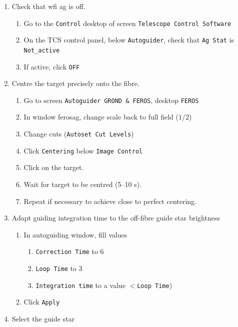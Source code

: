 \documentclass[11pt,fleqn,a4paper]{book}
\begin{document}
\label{proc:guideferosoff}
\begin{enumerate}
    \item Check that \gls{wfi} \gls{ag} is off.
    \begin{enumerate}
        \item Go to the \texttt{Control} \gls{desktop} of screen \texttt{Telescope Control Software}
        \item On the \gls{TCS control panel}, below \texttt{Autoguider}, check that \texttt{Ag Stat} is \texttt{Not\_active}
        \item If active, click \texttt{OFF} 
    \end{enumerate}
    \item Centre the target precisely onto the fibre.
    \begin{enumerate}
        \item Go to screen \texttt{Autoguider GROND \& FEROS}, \gls{desktop} \texttt{FEROS}
        \item In window \gls{ferosag}, change scale back to full field ($1/2$) 
        \item Change cuts (\texttt{Autoset Cut Levels})
        \item Click \texttt{Centering} below \texttt{Image Control}
        \item Click on the target.
        \item Wait for target to be centred (5--10 s).
        \item Repeat if necessary to achieve close to perfect centering.
    \end{enumerate}
    \item Adapt guiding integration time to the off-fibre guide star brightness
    \begin{enumerate}
        \item In \gls{autoguiding} window, fill values
            \begin{enumerate}
                \item \texttt{Correction Time} to 6
                \item \texttt{Loop Time} to 3
                \item \texttt{Integration time} to a value $< $\texttt{Loop Time})
            \end{enumerate}
        \item Click \texttt{Apply}
    \end{enumerate}
    \item Select the guide star

\end{enumerate}
\end{document}
